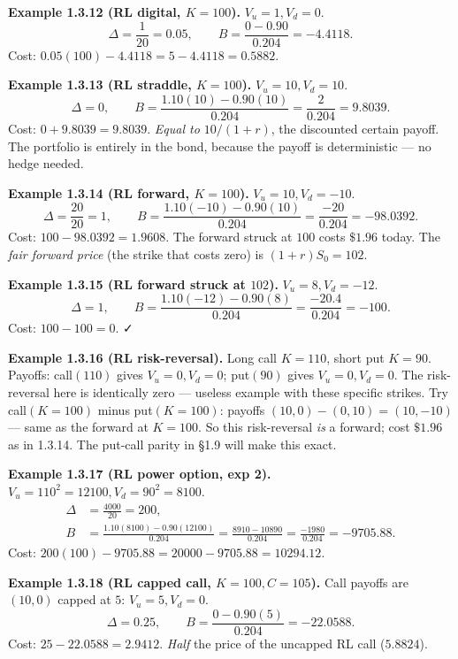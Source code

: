 \documentclass[
  10pt,
  twoside]{book}
\begin{document}
\textbf{Example 1.3.12 (RL digital, \(K=100\)).} \(V_u=1, V_d=0\).
\[\Delta = \frac{1}{20} = 0.05, \qquad B = \frac{0 - 0.90}{0.204} = -4.4118.\]
Cost: \(0.05(100) - 4.4118 = 5 - 4.4118 = 0.5882\).

\textbf{Example 1.3.13 (RL straddle, \(K=100\)).} \(V_u=10, V_d=10\).
\[\Delta = 0, \qquad B = \frac{1.10(10) - 0.90(10)}{0.204} = \frac{2}{0.204} = 9.8039.\]
Cost: \(0 + 9.8039 = 9.8039\). \emph{Equal to \(10/(1+r)\)}, the
discounted certain payoff. The portfolio is entirely in the bond,
because the payoff is deterministic --- no hedge needed.

\textbf{Example 1.3.14 (RL forward, \(K=100\)).} \(V_u=10, V_d=-10\).
\[\Delta = \frac{20}{20} = 1, \qquad B = \frac{1.10(-10) - 0.90(10)}{0.204} = \frac{-20}{0.204} = -98.0392.\]
Cost: \(100 - 98.0392 = 1.9608\). The forward struck at \(100\) costs
\(\$1.96\) today. The \emph{fair forward price} (the strike that costs
zero) is \((1+r)S_0 = 102\).

\textbf{Example 1.3.15 (RL forward struck at \(102\)).}
\(V_u=8, V_d=-12\).
\[\Delta = 1, \qquad B = \frac{1.10(-12) - 0.90(8)}{0.204} = \frac{-20.4}{0.204} = -100.\]
Cost: \(100 - 100 = 0\). ✓

\textbf{Example 1.3.16 (RL risk-reversal).} Long call \(K=110\), short
put \(K=90\). Payoffs: call\((110)\) gives \(V_u=0, V_d=0\); put\((90)\)
gives \(V_u=0, V_d=0\). The risk-reversal here is identically zero ---
useless example with these specific strikes. Try call\((K=100)\) minus
put\((K=100)\): payoffs \((10,0)-(0,10) = (10,-10)\) --- same as the
forward at \(K=100\). So this risk-reversal \emph{is} a forward; cost
\(\$1.96\) as in 1.3.14. The put-call parity in §1.9 will make this
exact.

\textbf{Example 1.3.17 (RL power option, exp 2).}
\(V_u=110^2=12100, V_d=90^2=8100\). \[
\begin{aligned}
\Delta &= \frac{4000}{20} = 200, \\
B &= \frac{1.10(8100) - 0.90(12100)}{0.204}
  = \frac{8910 - 10890}{0.204}
  = \frac{-1980}{0.204}
  = -9705.88.
\end{aligned}
\] Cost: \(200(100) - 9705.88 = 20000 - 9705.88 = 10294.12\).

\textbf{Example 1.3.18 (RL capped call, \(K=100, C=105\)).} Call payoffs
are \((10,0)\) capped at \(5\): \(V_u=5, V_d=0\).
\[\Delta = 0.25, \qquad B = \frac{0 - 0.90(5)}{0.204} = -22.0588.\]
Cost: \(25 - 22.0588 = 2.9412\). \emph{Half} the price of the uncapped
RL call (\(5.8824\)).
\end{document}
